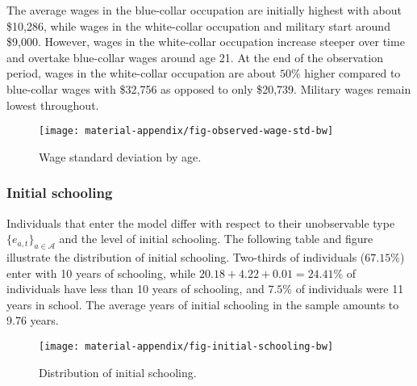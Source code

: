 The average wages in the blue-collar occupation are initially highest with about \$10,286, while wages in the white-collar occupation and military start around \$9,000. However, wages in the white-collar occupation increase steeper over time and overtake blue-collar wages around age 21. At the end of the observation period, wages in the white-collar occupation are about $50\%$ higher compared to blue-collar wages with \$32,756 as opposed to only \$20,739. Military wages remain lowest throughout.
\newpage

\begin{figure}[h]\centering
\caption{Wage standard deviation by age.}\label{fig:WageMoments}
\texttt{[image: material-appendix/fig-observed-wage-std-bw]}
\end{figure}

\subsubsection*{Initial schooling}

Individuals that enter the model differ with respect to their unobservable type $\{e_{a,t}\}_{a \in \mathcal{A}}$ and the level of initial schooling. The following table and figure illustrate the distribution of initial schooling. Two-thirds of individuals ($67.15\%$) enter with 10 years of schooling, while $20.18 + 4.22 + 0.01 = 24.41\%$ of individuals have less than 10 years of schooling, and $7.5\%$ of individuals were 11 years in school. The average years of initial schooling in the sample amounts to 9.76 years.
%
\begin{figure}[h]\centering
\caption{Distribution of initial schooling.}\label{fig:InitialSchooling}
\texttt{[image: material-appendix/fig-initial-schooling-bw]}
\end{figure}

